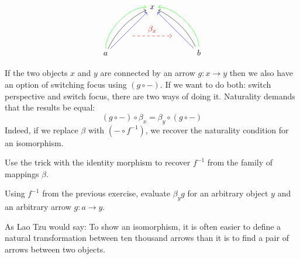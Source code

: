 \documentclass[DaoFP]{subfiles}
\begin{document}
\[
 \begin{tikzcd}
 \node(x) at (0, 2) {x};
 \node(a) at (-2, 0) {a};
 \node(b) at (2, 0) {b};
 \node(c1) at (-1, 1.5) {};
 \node(c2) at (-1.5, 1) {};
 \node(c3) at (-1, 2) {};
 \node(c4) at (-2, 1) {};
 \node(d1) at (1, 1.5) {};
 \node(d2) at (1.5, 1) {};
 \node(d3) at (1, 2) {};
 \node(d4) at (2, 1) {};
\node (aa) at (-1, 0.75) {};
 \node (bb) at (1, 0.75) {};
 \draw[<-] (x) .. controls (c1)  and (c2) .. (a); %
 \draw[<-, green] (x) .. controls (c3)  and (c4) .. (a); %
 \draw[<-, blue] (x) -- (a); 
  \draw[<-] (x) .. controls (d1)  and (d2) .. (b); %
 \draw[<-, green] (x) .. controls (d3)  and (d4) .. (b); %
 \draw[<-, blue] (x) -- (b); 
 \draw[->, red, dashed] (aa) -- node[above]{\beta_x} (bb);
 \end{tikzcd}
\]


If the two objects $x$ and $y$ are connected by an arrow $g \colon x \to y$ then we also have an option of switching focus using $(g \circ -)$. If we want to do both: switch perspective and switch focus, there are two ways of doing it. Naturality demands that the results be equal:
\[ (g \circ -) \circ \beta_x = \beta_y \circ (g \circ -) \]
Indeed, if we replace $\beta$ with $(- \circ f^{-1})$, we recover the naturality condition for an isomorphism. 

\begin{exercise}
Use the trick with the identity morphism to recover $f^{-1}$ from the family of mappings $\beta$.
\end{exercise}
\begin{exercise}
Using $f^{-1}$ from the previous exercise, evaluate $\beta_y g$ for an arbitrary object $y$ and an arbitrary arrow $g \colon a \to y$.
\end{exercise}


As Lao Tzu would say: To show an isomorphism, it is often easier to define a natural transformation between ten thousand arrows than it is to find a pair of arrows between two objects.
\end{document}
